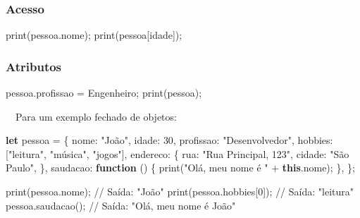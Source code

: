 \documentclass[
  portuguese,
  letterpaper,
  DIV=11,
  numbers=noendperiod]{scrreprt}
\newenvironment{Shaded}{\begin{snugshade}}{\end{snugshade}}
\newcommand{\AttributeTok}[1]{\textcolor[rgb]{0.40,0.45,0.13}{#1}}
\newcommand{\CommentTok}[1]{\textcolor[rgb]{0.37,0.37,0.37}{#1}}
\newcommand{\DataTypeTok}[1]{\textcolor[rgb]{0.68,0.00,0.00}{#1}}
\newcommand{\DecValTok}[1]{\textcolor[rgb]{0.68,0.00,0.00}{#1}}
\newcommand{\FunctionTok}[1]{\textcolor[rgb]{0.28,0.35,0.67}{#1}}
\newcommand{\KeywordTok}[1]{\textcolor[rgb]{0.00,0.23,0.31}{\textbf{#1}}}
\newcommand{\NormalTok}[1]{\textcolor[rgb]{0.00,0.23,0.31}{#1}}
\newcommand{\OperatorTok}[1]{\textcolor[rgb]{0.37,0.37,0.37}{#1}}
\newcommand{\OtherTok}[1]{\textcolor[rgb]{0.00,0.23,0.31}{#1}}
\newcommand{\StringTok}[1]{\textcolor[rgb]{0.13,0.47,0.30}{#1}}
\begin{document}
\subsubsection{Acesso}\label{acesso-1}

\begin{Shaded}
\begin{Highlighting}[]
\FunctionTok{print}\NormalTok{(pessoa.nome);}
\FunctionTok{print}\NormalTok{(pessoa[}\StringTok{\textquotesingle{}idade\textquotesingle{}}\NormalTok{]);}
\end{Highlighting}
\end{Shaded}

\subsubsection{Atributos}\label{atributos}

\begin{Shaded}
\begin{Highlighting}[]
\NormalTok{pessoa.profissao }\OtherTok{=} \StringTok{\textquotesingle{}Engenheiro\textquotesingle{}}\NormalTok{;}
\FunctionTok{print}\NormalTok{(pessoa);}
\end{Highlighting}
\end{Shaded}

~~Para um exemplo fechado de objetos:

\begin{Shaded}
\begin{Highlighting}[]
\KeywordTok{let}\NormalTok{ pessoa }\OperatorTok{=}\NormalTok{ \{}
  \DataTypeTok{nome}\OperatorTok{:} \StringTok{"João"}\OperatorTok{,}
  \DataTypeTok{idade}\OperatorTok{:} \DecValTok{30}\OperatorTok{,}
  \DataTypeTok{profissao}\OperatorTok{:} \StringTok{"Desenvolvedor"}\OperatorTok{,}
  \DataTypeTok{hobbies}\OperatorTok{:}\NormalTok{ [}\StringTok{"leitura"}\OperatorTok{,} \StringTok{"música"}\OperatorTok{,} \StringTok{"jogos"}\NormalTok{]}\OperatorTok{,}
  \DataTypeTok{endereco}\OperatorTok{:}\NormalTok{ \{}
    \DataTypeTok{rua}\OperatorTok{:} \StringTok{"Rua Principal, 123"}\OperatorTok{,}
    \DataTypeTok{cidade}\OperatorTok{:} \StringTok{"São Paulo"}\OperatorTok{,}
\NormalTok{  \}}\OperatorTok{,}
  \DataTypeTok{saudacao}\OperatorTok{:} \KeywordTok{function}\NormalTok{ () \{}
    \FunctionTok{print}\NormalTok{(}\StringTok{"Olá, meu nome é "} \OperatorTok{+} \KeywordTok{this}\OperatorTok{.}\AttributeTok{nome}\NormalTok{)}\OperatorTok{;}
\NormalTok{  \}}\OperatorTok{,}
\NormalTok{\}}\OperatorTok{;}

\FunctionTok{print}\NormalTok{(pessoa}\OperatorTok{.}\AttributeTok{nome}\NormalTok{)}\OperatorTok{;} \CommentTok{// Saída: "João"}
\FunctionTok{print}\NormalTok{(pessoa}\OperatorTok{.}\AttributeTok{hobbies}\NormalTok{[}\DecValTok{0}\NormalTok{])}\OperatorTok{;} \CommentTok{// Saída: "leitura"}
\NormalTok{pessoa}\OperatorTok{.}\FunctionTok{saudacao}\NormalTok{()}\OperatorTok{;} \CommentTok{// Saída: "Olá, meu nome é João"}
\end{Highlighting}
\end{Shaded}
\end{document}
